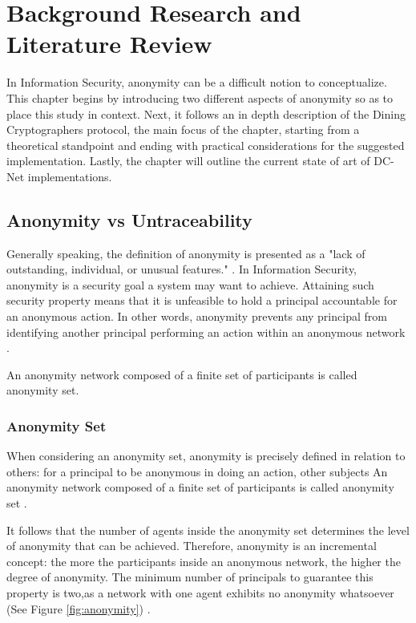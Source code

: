 \chapter{Background Research and Literature Review}

In Information Security, anonymity can be a difficult notion to conceptualize. This chapter begins by introducing two different aspects of anonymity so as to place this study in context. Next, it follows an in depth description of the Dining Cryptographers protocol, the main focus of the chapter, starting from a theoretical standpoint and ending with practical considerations for the suggested implementation. Lastly, the chapter will outline the current state of art of DC-Net implementations.

\section{Anonymity vs Untraceability}
Generally speaking, the definition of anonymity is presented as a "lack of outstanding, individual, or unusual features." \cite{Anonymity}. In Information Security, anonymity is a security goal a system may want to achieve. Attaining such security property means that it is unfeasible to hold a principal accountable for an anonymous action. In other words, anonymity prevents any principal from identifying another principal performing an action within an anonymous network \cite{Malkhi}.

An anonymity network composed of a finite set of participants is called anonymity set.

\subsection{Anonymity Set} \label{sec:anonymityset}
When considering an anonymity set, anonymity is precisely defined in relation to others: for a principal to be anonymous in doing an action, other subjects An anonymity network composed of a finite set of participants is called anonymity set \cite{Pfitzmann}.

It follows that the number of agents inside the anonymity set determines the level of anonymity that can be achieved. Therefore, anonymity is an incremental concept: the more the participants inside an anonymous network, the higher the degree of anonymity. The minimum number of principals to guarantee this property is two,as a network with one agent exhibits no anonymity whatsoever (See Figure \ref{fig:anonymity}) \cite{Franck}.

